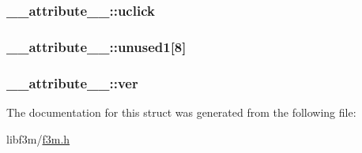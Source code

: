 \subsubsection[{uclick}]{ \+\_\+\+\_\+attribute\+\_\+\+\_\+\+::uclick}\label{struct____attribute_____a615d8deee60857f787edbe5a4f9b8663}
\hypertarget{struct____attribute_____a219da68c9162d77e0f6253829ef341b5}{}
\subsubsection[{unused1}]{ \+\_\+\+\_\+attribute\+\_\+\+\_\+\+::unused1\mbox{[}8\mbox{]}}\label{struct____attribute_____a219da68c9162d77e0f6253829ef341b5}
\hypertarget{struct____attribute_____a06fbe8067948a00f7c7d3b3972f1b944}{}
\subsubsection[{ver}]{ \+\_\+\+\_\+attribute\+\_\+\+\_\+\+::ver}\label{struct____attribute_____a06fbe8067948a00f7c7d3b3972f1b944}


The documentation for this struct was generated from the following file\+:\begin{DoxyCompactItemize}
\item 
libf3m/\hyperlink{f3m_8h}{f3m.\+h}\end{DoxyCompactItemize}
